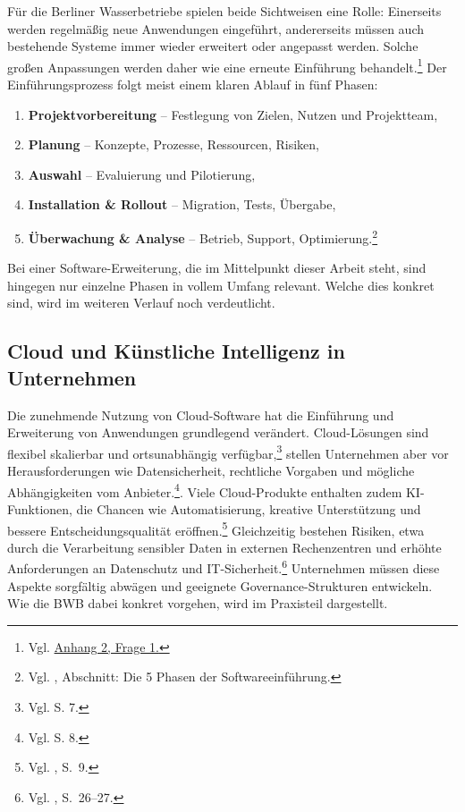 \documentclass[
    12pt, 
    a4paper,
    ]{scrartcl} %
\begin{document}
Für die Berliner Wasserbetriebe spielen beide Sichtweisen eine Rolle: Einerseits werden regelmäßig neue Anwendungen eingeführt, andererseits müssen auch bestehende Systeme immer wieder erweitert oder angepasst werden. Solche großen Anpassungen werden daher wie eine erneute Einführung behandelt.\footnote{Vgl. \hyperref[sec:Anhang2]{Anhang 2, Frage 1.}}
Der Einführungsprozess folgt meist einem klaren Ablauf in fünf Phasen:  
\begin{enumerate}
    \item \textbf{Projektvorbereitung} – Festlegung von Zielen, Nutzen und Projektteam,
    \item \textbf{Planung} – Konzepte, Prozesse, Ressourcen, Risiken,
    \item \textbf{Auswahl} – Evaluierung und Pilotierung,
    \item \textbf{Installation \& Rollout} – Migration, Tests, Übergabe,
    \item \textbf{Überwachung \& Analyse} – Betrieb, Support, Optimierung.\footnote{Vgl. \cite{papershift2022}, Abschnitt: Die 5 Phasen der Softwareeinführung.}
\end{enumerate}
Bei einer Software-Erweiterung, die im Mittelpunkt dieser Arbeit steht, sind hingegen nur einzelne Phasen in vollem Umfang relevant. Welche dies konkret sind, wird im weiteren Verlauf noch verdeutlicht.
\subsection{Cloud und Künstliche Intelligenz in Unternehmen}

Die zunehmende Nutzung von Cloud-Software hat die Einführung und Erweiterung von Anwendungen grundlegend verändert. Cloud-Lösungen sind flexibel skalierbar und ortsunabhängig verfügbar,\footnote{Vgl. \cite{BSI_2024} S. 7.} stellen Unternehmen aber vor Herausforderungen wie Datensicherheit, rechtliche Vorgaben und mögliche Abhängigkeiten vom Anbieter.\footnote{Vgl. \cite{BSI_2024} S. 8.}. 
Viele Cloud-Produkte enthalten zudem KI-Funktionen, die Chancen wie Automatisierung, kreative Unterstützung und bessere Entscheidungsqualität eröffnen.\footnote{Vgl. \cite{S_BSI_KI}, S.~9.} Gleichzeitig bestehen Risiken, etwa durch die Verarbeitung sensibler Daten in externen Rechenzentren und erhöhte Anforderungen an Datenschutz und IT-Sicherheit.\footnote{Vgl. \cite{S_ENISA_AI}, S.~26--27.} 
Unternehmen müssen diese Aspekte sorgfältig abwägen und geeignete Governance-Strukturen entwickeln. Wie die BWB dabei konkret vorgehen, wird im Praxisteil dargestellt.
\end{document}
